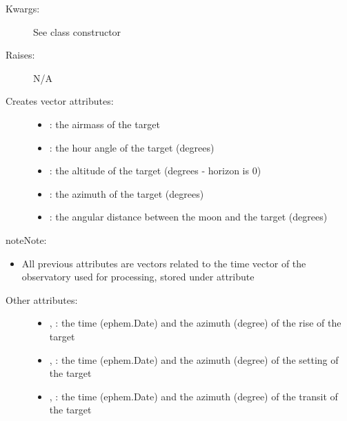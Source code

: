 \documentclass[letterpaper,10pt,english]{sphinxmanual}
\begin{document}
\begin{fulllineitems}
\begin{fulllineitems}
\begin{description}
\item[{Kwargs:}] \leavevmode
See class constructor

\item[{Raises:}] \leavevmode
N/A

\item[{Creates vector attributes:}] \leavevmode\begin{itemize}
\item {} 
: the airmass of the target

\item {} 
: the hour angle of the target (degrees)

\item {} 
: the altitude of the target (degrees - horizon is 0)

\item {} 
: the azimuth of the target (degrees)

\item {} 
: the angular distance between the moon and the target (degrees)

\end{itemize}

\end{description}

\begin{notice}{note}{Note:}\begin{itemize}
\item {} 
All previous attributes are vectors related to the time vector of the observatory used for processing, stored under  attribute

\end{itemize}
\end{notice}
\begin{description}
\item[{Other attributes:}] \leavevmode\begin{itemize}
\item {} 
, : the time (ephem.Date) and the azimuth (degree) of the rise of the target

\item {} 
, : the time (ephem.Date) and the azimuth (degree) of the setting of the target

\item {} 
, : the time (ephem.Date) and the azimuth (degree) of the transit of the target

\end{itemize}


\end{description}
\end{fulllineitems}
\end{fulllineitems}
\end{document}

